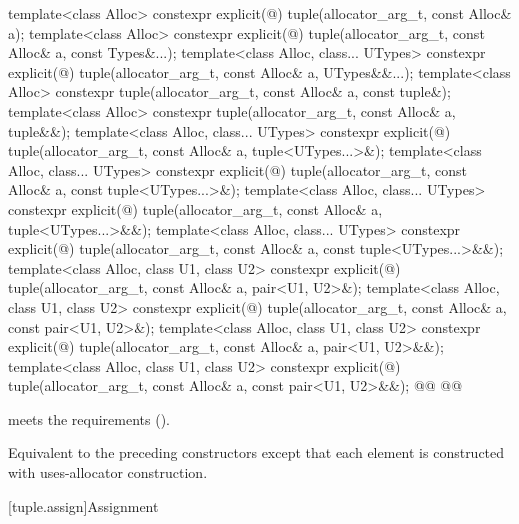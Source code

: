 \documentclass{wg21}
\begin{document}
%
\begin{itemdecl}
    template<class Alloc>
    constexpr explicit(@\seebelow@)
    tuple(allocator_arg_t, const Alloc& a);
    template<class Alloc>
    constexpr explicit(@\seebelow@)
    tuple(allocator_arg_t, const Alloc& a, const Types&...);
    template<class Alloc, class... UTypes>
    constexpr explicit(@\seebelow@)
    tuple(allocator_arg_t, const Alloc& a, UTypes&&...);
    template<class Alloc>
    constexpr tuple(allocator_arg_t, const Alloc& a, const tuple&);
    template<class Alloc>
    constexpr tuple(allocator_arg_t, const Alloc& a, tuple&&);
    template<class Alloc, class... UTypes>
    constexpr explicit(@\seebelow@)
    tuple(allocator_arg_t, const Alloc& a, tuple<UTypes...>&);
    template<class Alloc, class... UTypes>
    constexpr explicit(@\seebelow@)
    tuple(allocator_arg_t, const Alloc& a, const tuple<UTypes...>&);
    template<class Alloc, class... UTypes>
    constexpr explicit(@\seebelow@)
    tuple(allocator_arg_t, const Alloc& a, tuple<UTypes...>&&);
    template<class Alloc, class... UTypes>
    constexpr explicit(@\seebelow@)
    tuple(allocator_arg_t, const Alloc& a, const tuple<UTypes...>&&);
    template<class Alloc, class U1, class U2>
    constexpr explicit(@\seebelow@)
    tuple(allocator_arg_t, const Alloc& a, pair<U1, U2>&);
    template<class Alloc, class U1, class U2>
    constexpr explicit(@\seebelow@)
    tuple(allocator_arg_t, const Alloc& a, const pair<U1, U2>&);
    template<class Alloc, class U1, class U2>
    constexpr explicit(@\seebelow@)
    tuple(allocator_arg_t, const Alloc& a, pair<U1, U2>&&);
    template<class Alloc, class U1, class U2>
    constexpr explicit(@\seebelow@)
    tuple(allocator_arg_t, const Alloc& a, const pair<U1, U2>&&);
    @@
    @@
\end{itemdecl}

\begin{itemdescr}
    \pnum
    \expects
     meets the
     requirements ().

    \pnum
    \effects
    Equivalent to the preceding constructors except that each element is constructed with
    uses-allocator construction.
\end{itemdescr}

[tuple.assign]{Assignment}
\end{document}
